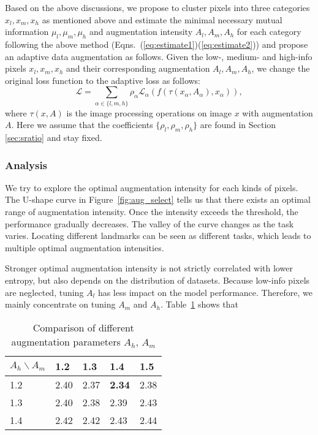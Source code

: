 \documentclass[10pt,twocolumn,letterpaper]{article}
\begin{document}
Based on the above discussions, we propose to cluster pixels into three categories $x_l, x_m, x_h$ as mentioned above and estimate the minimal necessary mutual information $\mu_l, \mu_m, \mu_h$ and augmentation intensity $A_l, A_m, A_h$ for each category following the above method (Eqns.~(\ref{eq:estimate1})(\ref{eq:estimate2})) and propose an adaptive data augmentation as follows.
Given the low-, medium- and high-info pixels $x_l, x_m, x_h$ and their corresponding augmentation $A_l, A_m, A_h$, we change the original loss function to the adaptive loss as follows:
\begin{equation}
    \mathcal{L} = \sum_{\alpha \in \{l,m,h\}} \rho_\alpha \mathcal{L}_\alpha(f(\tau (x_\alpha, A_\alpha), x_\alpha)),
\end{equation}
where $\tau(x, A)$ is the image processing operations on image $x$ with augmentation $A$. Here we assume that the coefficients $\{\rho_l,\rho_m,\rho_h\}$ are found in Section \ref{sec:sratio} and stay fixed.

\subsubsection{Analysis}
We try to explore the optimal augmentation intensity for each kinds of pixels. 
The U-shape curve in Figure~\ref{fig:aug_select} tells us that there exists an optimal range of augmentation intensity. Once the intensity exceeds the threshold, the performance gradually decreases. The valley of the curve changes as the task varies. Locating different landmarks can be seen as different tasks, which leads to multiple optimal augmentation intensities. 

Stronger optimal augmentation intensity is not strictly correlated with lower entropy, but also depends on the distribution of datasets. Because low-info pixels are neglected, tuning $A_l$ has less impact on the model performance. Therefore, we mainly concentrate on tuning $A_m$ and $A_h$. Table~\ref{table:adap_aug} shows that 

\begin{table}[]
    \centering
    \begin{tabular}{l|l|l|l|l}
    \hline
         $A_h \backslash A_m$ & 1.2 & 1.3 & 1.4 & 1.5 \\
         \hline
         1.2 & 2.40 & 2.37 & \textbf{2.34} & 2.38 \\
         \hline
         1.3 & 2.40 & 2.38 & 2.39 & 2.43\\
         \hline
         1.4 & 2.42& 2.42 & 2.43 & 2.44\\
         \hline
    \end{tabular}
    \caption{Comparison of different augmentation parameters $A_h$, $A_m$}
    \label{table:adap_aug}
\end{table}
\end{document}
